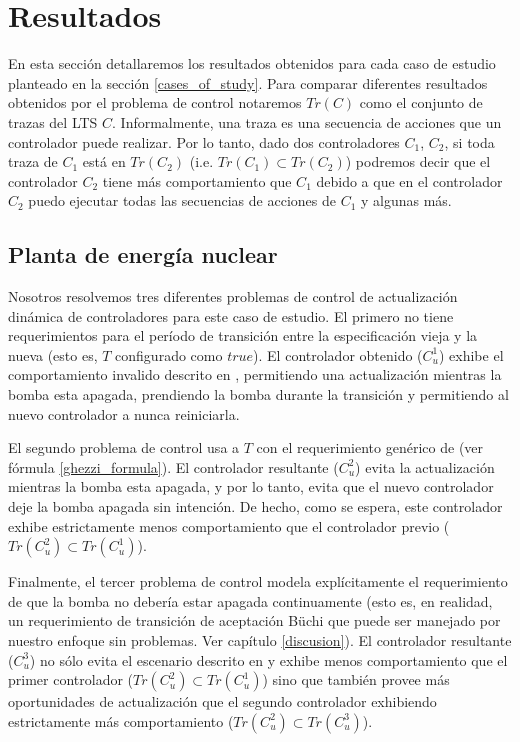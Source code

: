 \section{Resultados}

En esta sección detallaremos los resultados obtenidos para cada caso de estudio planteado en la sección
\ref{cases_of_study}. Para comparar diferentes resultados obtenidos por el problema de control notaremos $Tr(C)$ como el
conjunto de trazas del LTS $C$. Informalmente, una traza es una secuencia de acciones que un controlador puede
realizar. Por lo tanto, dado dos controladores $C_1$, $C_2$, si toda traza de $C_1$ está en $Tr(C_2)$ (i.e. $Tr(C_1) \subset
Tr(C_2)$) podremos decir que el controlador $C_2$ tiene más comportamiento que $C_1$ debido a que en el controlador
$C_2$ puedo ejecutar todas las secuencias de acciones de $C_1$ y algunas más.

\subsection{Planta de energía nuclear}

Nosotros resolvemos tres diferentes problemas de control de actualización dinámica de controladores para este caso de
estudio. El primero no tiene requerimientos para el período de transición entre la especificación vieja y la nueva (esto
es, $T$ configurado como $true$). El controlador obtenido ($C^1_u$) exhibe el comportamiento invalido descrito en
\cite{PanzicaLaManna:2013:FCC:2487336.2487349}, permitiendo una actualización mientras la bomba esta apagada, prendiendo
la bomba durante la transición y permitiendo al nuevo controlador a nunca reiniciarla.

El segundo problema de control usa a $T$ con el requerimiento genérico de \cite{6224401} (ver fórmula
\ref{ghezzi_formula}). El controlador resultante ($C^2_u$) evita la actualización mientras la bomba esta apagada, y por
lo tanto, evita que el nuevo controlador deje la bomba apagada sin intención. De hecho, como se espera, este controlador
exhibe estrictamente menos comportamiento que el controlador previo ($Tr(C^2_u) \subset Tr(C^1_u)$).

Finalmente, el tercer problema de control modela explícitamente el requerimiento de que la bomba no debería estar
apagada continuamente (esto es, en realidad, un requerimiento de transición de aceptación Büchi que puede ser manejado
por nuestro enfoque sin problemas. Ver capítulo \ref{discusion}). El controlador resultante ($C^3_u$) no sólo evita el
escenario descrito en \cite{PanzicaLaManna:2013:FCC:2487336.2487349} y exhibe menos comportamiento que el primer
controlador ($Tr(C^2_u) \subset Tr(C^1_u)$) sino que también provee más oportunidades de actualización que el segundo
controlador exhibiendo estrictamente más comportamiento ($Tr(C^2_u) \subset Tr(C^3_u)$). 

